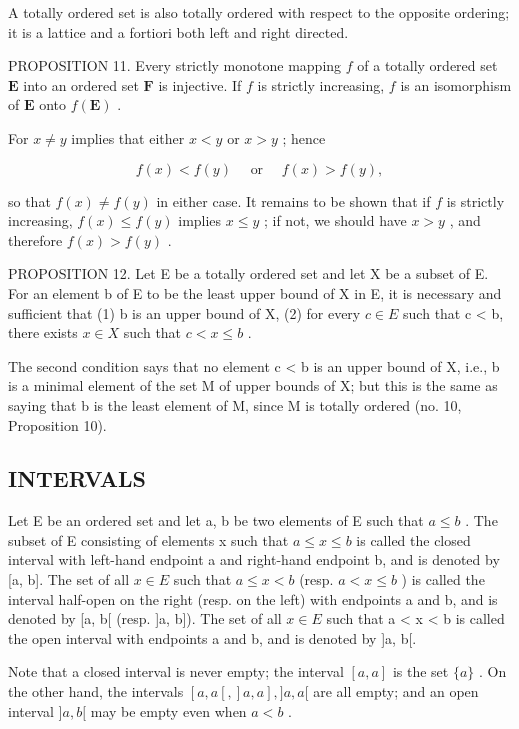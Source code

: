 A totally ordered set is also totally ordered with respect to the opposite ordering; it is a lattice and a fortiori both left and right directed.

PROPOSITION 11. Every strictly monotone mapping \(f\) of a totally ordered set \(\mathbf{E}\) into an ordered set \(\mathbf{F}\) is injective. If \(f\) is strictly increasing, \(f\) is an isomorphism of \(\mathbf{E}\) onto \(f(\mathbf{E})\) .

For \(x \neq y\) implies that either \(x < y\) or \(x > y\) ; hence

\[
f (x) <   f (y) \quad \text { or } \quad f (x) > f (y),
\]

so that \(f(x) \neq f(y)\) in either case. It remains to be shown that if \(f\) is strictly increasing, \(f(x) \leqslant f(y)\) implies \(x \leqslant y\) ; if not, we should have \(x > y\) , and therefore \(f(x) > f(y)\) .

PROPOSITION 12. Let E be a totally ordered set and let X be a subset of E. For an element b of E to be the least upper bound of X in E, it is necessary and sufficient that (1) b is an upper bound of X, (2) for every \(c \in E\) such that c \textless{} b, there exists \(x \in X\) such that \(c < x \leqslant b\) .

The second condition says that no element c \textless{} b is an upper bound of X, i.e., b is a minimal element of the set M of upper bounds of X; but this is the same as saying that b is the least element of M, since M is totally ordered (no. 10, Proposition 10).

\subsection{INTERVALS}

Let E be an ordered set and let a, b be two elements of E such that \(a \leqslant b\) . The subset of E consisting of elements x such that \(a \leqslant x \leqslant b\) is called the closed interval with left-hand endpoint a and right-hand endpoint b, and is denoted by {[}a, b{]}. The set of all \(x \in E\) such that \(a \leqslant x < b\) (resp. \(a < x \leqslant b\) ) is called the interval half-open on the right (resp. on the left) with endpoints a and b, and is denoted by {[}a, b{[} (resp. {]}a, b{]}). The set of all \(x \in E\) such that a \textless{} x \textless{} b is called the open interval with endpoints a and b, and is denoted by {]}a, b{[}.

Note that a closed interval is never empty; the interval \([a, a]\) is the set \(\{a\}\) . On the other hand, the intervals \([a, a[, ]a, a], ]a, a[\) are all empty; and an open interval \(]a, b[\) may be empty even when \(a < b\) .

